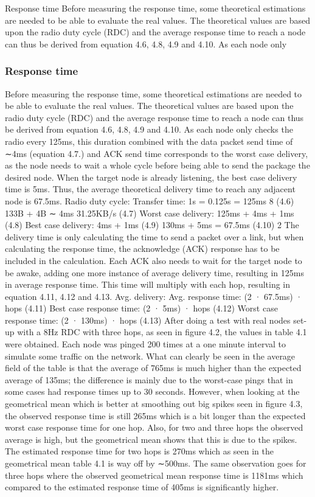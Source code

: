 Response time
Before measuring the response time, some theoretical estimations are needed
to be able to evaluate the real values. The theoretical values are based upon
the radio duty cycle (RDC) and the average response time to reach a node
can thus be derived from equation 4.6, 4.8, 4.9 and 4.10. As each node only

\subsubsection{Response time}
Before measuring the response time,
	some theoretical estimations are needed to be able to evaluate the real values.
The theoretical values are based upon the radio duty cycle (RDC) and the average response time to reach a node can thus be derived from equation 4.6, 4.8, 4.9 and 4.10.
As each node only checks the radio every 125ms,
	this duration combined with the data packet send time of ∼4ms (equation 4.7.) and ACK send time corresponds to the worst case delivery,
	as the node needs to wait a whole cycle before being able to send the package the desired node.
When the target node is already listening,
	the best case delivery time is 5ms.
Thus,
	the average theoretical delivery time to reach any adjacent node is 67.5ms.
Radio duty cycle:
	Transfer time: 1s = 0.125s = 125ms 8 (4.6) 133B + 4B ∼ 4ms 31.25KB/s (4.7) Worst case delivery: 125ms + 4ms + 1ms (4.8) Best case delivery: 4ms + 1ms (4.9) 130ms + 5ms = 67.5ms (4.10) 2 The delivery time is only calculating the time to send a packet over a link,
	but when calculating the response time,
	the acknowledge (ACK) response has to be included in the calculation.
Each ACK also needs to wait for the target node to be awake,
	adding one more instance of average delivery time,
	resulting in 125ms in average response time.
This time will multiply with each hop,
	resulting in equation 4.11, 4.12 and 4.13.
Avg.
delivery:
	Avg.
response time:
	(2 · 67.5ms) · hops (4.11) Best case response time:
	(2 · 5ms) · hops (4.12) Worst case response time:
	(2 · 130ms) · hops (4.13) After doing a test with real nodes set-up with a 8Hz RDC with three hops,
	as seen in figure 4.2,
	the values in table 4.1 were obtained.
Each node was pinged 200 times at a one minute interval to simulate some traffic on the network.
What can clearly be seen in the average field of the table is that the average of 765ms is much higher than the expected average of 135ms;
	the difference is mainly due to the worst-case pings that in some cases had response times up to 30 seconds.
However,
	when looking at the geometrical mean which is better at smoothing out big spikes seen in figure 4.3,
	the observed response time is still 265ms which is a bit longer than the expected worst case response time for one hop.
Also,
	for two and three hops the observed average is high,
	but the geometrical mean shows that this is due to the spikes.
The estimated response time for two hops is 270ms which as seen in the geometrical mean table 4.1 is way off by ∼500ms.
The same observation goes for three hops where the observed geometrical mean response time is 1181ms which compared to the estimated response time of 405ms is significantly higher.

